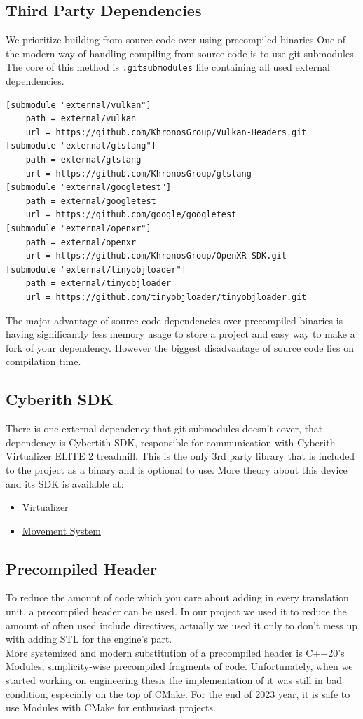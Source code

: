 \subsection{Third Party Dependencies}
\label{lst:3rdparty}
We prioritize building from source code over using precompiled binaries
One of the modern way of handling compiling from source code is to use git submodules. The core of this method is \texttt{.gitsubmodules} file containing all used external dependencies.
\begin{lstlisting}[caption=.gitsubmodules]
[submodule "external/vulkan"]
	path = external/vulkan
	url = https://github.com/KhronosGroup/Vulkan-Headers.git
[submodule "external/glslang"]
	path = external/glslang
	url = https://github.com/KhronosGroup/glslang
[submodule "external/googletest"]
	path = external/googletest
	url = https://github.com/google/googletest
[submodule "external/openxr"]
	path = external/openxr
	url = https://github.com/KhronosGroup/OpenXR-SDK.git
[submodule "external/tinyobjloader"]
	path = external/tinyobjloader
	url = https://github.com/tinyobjloader/tinyobjloader.git
\end{lstlisting}
The major advantage of source code dependencies over precompiled binaries is having significantly less memory usage to store a project and easy way to make a fork of your dependency. However the biggest disadvantage of source code lies on compilation time.

\subsection{Cyberith SDK}
There is one external dependency that git submodules doesn't cover, that dependency is Cybertith SDK, responsible for communication with Cyberith Virtualizer ELITE 2 treadmill.
This is the only 3rd party library that is included to the project as a binary and is optional to use.
More theory about this device and its SDK is available at:
\begin{itemize}
    \item \hyperref[]{Virtualizer} %
    \item \hyperref[sec:movement_system]{Movement System}
\end{itemize}

\subsection{Precompiled Header}
To reduce the amount of code which you care about adding in every translation unit, a precompiled header can be used. In our project we used it to reduce the amount of often used include directives, actually we used it only to don't mess up with adding STL for the engine's part.\\
More systemized and modern substitution of a precompiled header is C++20's Modules, simplicity-wise precompiled fragments of code. Unfortunately, when we started working on engineering thesis the implementation of it was still in bad condition, especially on the top of CMake. For the end of 2023 year, it is safe to use Modules with CMake for enthusiast projects.

